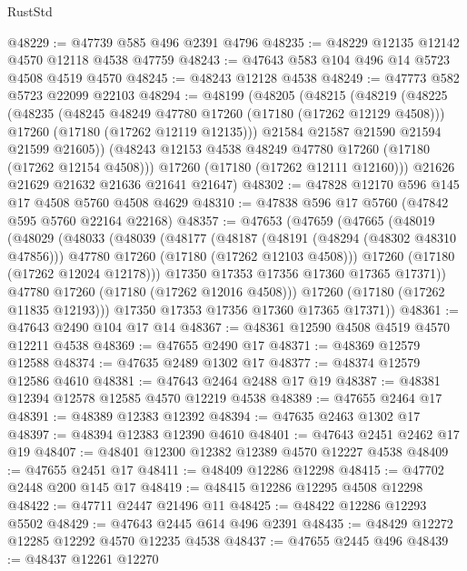 \begin{lexlean}{RustStd}
\begin{coremodule}
{\begin{coremodule}
{{{{{{{{{{{{{{{{{{{{{{{{{{{{{{{{{{{{{{{{{{{{{{{{{{{{{{{@48229 := @47739 @585 @496 @2391 @4796
@48235 := @48229 @12135 @12142 @4570 @12118 @4538 @47759
@48243 := @47643 @583 @104 @496 @14 @5723 @4508 @4519 @4570
@48245 := @48243 @12128 @4538
@48249 := @47773 @582 @5723 @22099 @22103
@48294 := @48199
    (@48205
      (@48215
        (@48219
          (@48225
            (@48235
              (@48245 @48249 @47780 @17260 (@17180 (@17262 @12129 @4508)))
              @17260
              (@17180 (@17262 @12119 @12135)))
            @21584
            @21587
            @21590
            @21594
            @21599
            @21605))
        (@48243 @12153 @4538 @48249 @47780 @17260 (@17180 (@17262 @12154 @4508)))
        @17260
        (@17180 (@17262 @12111 @12160)))
      @21626
      @21629
      @21632
      @21636
      @21641
      @21647)
@48302 := @47828 @12170 @596 @145 @17 @4508 @5760 @4508 @4629
@48310 := @47838 @596 @17 @5760 (@47842 @595 @5760 @22164 @22168)
@48357 := @47653
    (@47659
      (@47665
        (@48019
          (@48029
            (@48033
              (@48039
                (@48177
                  (@48187
                    (@48191 (@48294 (@48302 @48310 @47856)))
                    @47780
                    @17260
                    (@17180 (@17262 @12103 @4508)))
                  @17260
                  (@17180 (@17262 @12024 @12178)))
                @17350
                @17353
                @17356
                @17360
                @17365
                @17371))
            @47780
            @17260
            (@17180 (@17262 @12016 @4508)))
          @17260
          (@17180 (@17262 @11835 @12193)))
        @17350
        @17353
        @17356
        @17360
        @17365
        @17371))
@48361 := @47643 @2490 @104 @17 @14
@48367 := @48361 @12590 @4508 @4519 @4570 @12211 @4538
@48369 := @47655 @2490 @17
@48371 := @48369 @12579 @12588
@48374 := @47635 @2489 @1302 @17
@48377 := @48374 @12579 @12586 @4610
@48381 := @47643 @2464 @2488 @17 @19
@48387 := @48381 @12394 @12578 @12585 @4570 @12219 @4538
@48389 := @47655 @2464 @17
@48391 := @48389 @12383 @12392
@48394 := @47635 @2463 @1302 @17
@48397 := @48394 @12383 @12390 @4610
@48401 := @47643 @2451 @2462 @17 @19
@48407 := @48401 @12300 @12382 @12389 @4570 @12227 @4538
@48409 := @47655 @2451 @17
@48411 := @48409 @12286 @12298
@48415 := @47702 @2448 @200 @145 @17
@48419 := @48415 @12286 @12295 @4508 @12298
@48422 := @47711 @2447 @21496 @11
@48425 := @48422 @12286 @12293 @5502
@48429 := @47643 @2445 @614 @496 @2391
@48435 := @48429 @12272 @12285 @12292 @4570 @12235 @4538
@48437 := @47655 @2445 @496
@48439 := @48437 @12261 @12270
}}}}}}}}}}}}}}}}}}}}}}}}}}}}}}}}}}}}}}}}}}}}}}}}}}}}}}}
\end{coremodule}}
\end{coremodule}
\end{lexlean}
